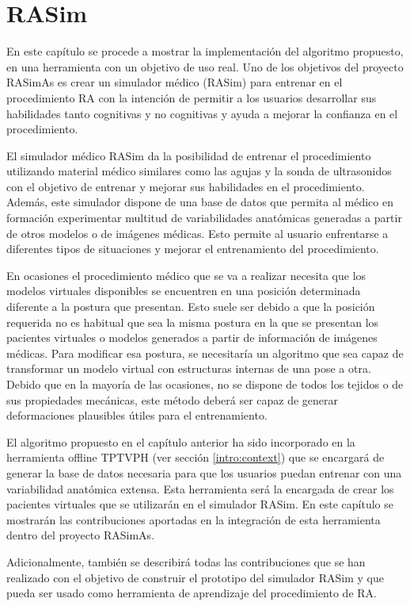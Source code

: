 \chapter{RASim} 
\label{cap:rasim}

En este capítulo se procede a mostrar la implementación del algoritmo propuesto, en una herramienta con un objetivo de uso real. Uno de los objetivos del proyecto \ac{RASimAs} es crear un simulador médico (\ac{RASim}) para entrenar en el procedimiento \ac{RA} con la intención de permitir a los usuarios desarrollar sus habilidades tanto cognitivas y no cognitivas y ayuda a mejorar la confianza en el procedimiento. 

El simulador médico \ac{RASim} da la posibilidad de entrenar el procedimiento utilizando material médico similares como las agujas y la sonda de ultrasonidos con el objetivo de entrenar y mejorar sus habilidades en el procedimiento. Además, este simulador dispone de una base de datos que permita al médico en formación experimentar multitud de variabilidades anatómicas generadas a partir de otros modelos o de imágenes médicas. Esto permite al usuario enfrentarse a diferentes tipos de situaciones y mejorar el entrenamiento del procedimiento.

En ocasiones el procedimiento médico que se va a realizar necesita que los modelos virtuales disponibles se encuentren en una posición determinada diferente a la postura que presentan. Esto suele ser debido a que la posición requerida  no es habitual que sea la misma postura en la que se presentan los pacientes virtuales o modelos generados a partir de información de imágenes médicas.
Para modificar esa postura, se necesitaría un algoritmo que sea capaz de transformar un modelo virtual con estructuras internas de una pose a otra. Debido que en la mayoría de las ocasiones, no se dispone de todos los tejidos o de sus propiedades mecánicas, este método deberá ser capaz de generar deformaciones plausibles útiles para el entrenamiento.

El algoritmo propuesto en el capítulo anterior ha sido incorporado en la herramienta  offline \ac{TPTVPH} (ver sección \ref{intro:context}) que se encargará de generar la base de datos necesaria para que los usuarios puedan entrenar con una variabilidad anatómica extensa. Esta herramienta será la encargada de crear los pacientes virtuales que se utilizarán en el simulador \ac{RASim}. En este capítulo se mostrarán las contribuciones aportadas en la integración de esta herramienta dentro del proyecto \ac{RASimAs}.

Adicionalmente, también se describirá todas las contribuciones que se han realizado con el objetivo de construir el prototipo del simulador \ac{RASim} y que pueda ser usado como herramienta de aprendizaje del procedimiento de \ac{RA}.







